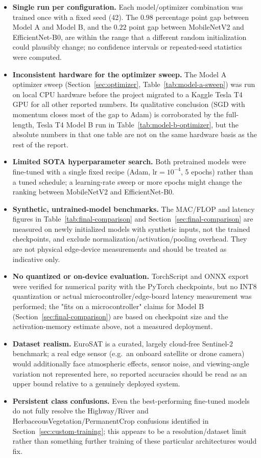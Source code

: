 \documentclass[11pt]{article}
\begin{document}
\begin{itemize}
  \item \textbf{Single run per configuration.} Each model/optimizer
  combination was trained once with a fixed seed (42). The $0.98$
  percentage point gap between Model A and Model B, and the $0.22$ point
  gap between MobileNetV2 and EfficientNet-B0, are within the range that a
  different random initialization could plausibly change; no confidence
  intervals or repeated-seed statistics were computed.
  \item \textbf{Inconsistent hardware for the optimizer sweep.} The Model A
  optimizer sweep (Section~\ref{sec:optimizer}, Table~\ref{tab:model-a-sweep})
  was run on local CPU hardware before the project migrated to a Kaggle
  Tesla T4 GPU for all other reported numbers. Its qualitative conclusion
  (SGD with momentum closes most of the gap to Adam) is corroborated by the
  full-length, Tesla T4 Model B run in Table~\ref{tab:model-b-optimizer},
  but the absolute numbers in that one table are not on the same hardware
  basis as the rest of the report.
  \item \textbf{Limited SOTA hyperparameter search.} Both pretrained models
  were fine-tuned with a single fixed recipe (Adam, $\text{lr}=10^{-4}$, 5
  epochs) rather than a tuned schedule; a learning-rate sweep or more epochs
  might change the ranking between MobileNetV2 and EfficientNet-B0.
  \item \textbf{Synthetic, untrained-model benchmarks.} The MAC/FLOP and
  latency figures in Table~\ref{tab:final-comparison} and
  Section~\ref{sec:final-comparison} are measured on newly initialized
  models with synthetic inputs, not the trained checkpoints, and exclude
  normalization/activation/pooling overhead. They are not physical
  edge-device measurements and should be treated as indicative only.
  \item \textbf{No quantized or on-device evaluation.} TorchScript and ONNX
  export were verified for numerical parity with the PyTorch checkpoints,
  but no INT8 quantization or actual microcontroller/edge-board latency
  measurement was performed; the "fits on a microcontroller" claims for
  Model B (Section~\ref{sec:final-comparison}) are based on checkpoint size
  and the activation-memory estimate above, not a measured deployment.
  \item \textbf{Dataset realism.} EuroSAT is a curated, largely cloud-free
  Sentinel-2 benchmark; a real edge sensor (e.g.\ an onboard satellite or
  drone camera) would additionally face atmospheric effects, sensor noise,
  and viewing-angle variation not represented here, so reported accuracies
  should be read as an upper bound relative to a genuinely deployed system.
  \item \textbf{Persistent class confusions.} Even the best-performing
  fine-tuned models do not fully resolve the Highway/River and
  HerbaceousVegetation/PermanentCrop confusions identified in
  Section~\ref{sec:custom-training}; this appears to be a
  resolution/dataset limit rather than something further training of these
  particular architectures would fix.
\end{itemize}
\end{document}
